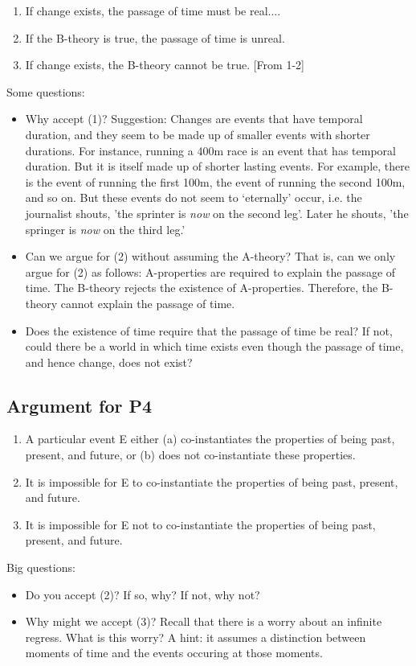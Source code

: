 \documentclass[oneside]{article}
\begin{document}
\begin{enumerate}
\item If change exists, the passage of time must be real....
\item If the B-theory is true, the passage of time is unreal.
\item If change exists, the B-theory cannot be true. [From 1-2]
\end{enumerate} 
Some questions:
\begin{itemize}
\item Why accept (1)? Suggestion: Changes are events that have temporal duration, and they seem to be made up of smaller events with shorter durations. For instance, running a 400m race is an event that has temporal duration. But it is itself made up of shorter lasting events. For example, there is the event of running the first 100m, the event of running the second 100m, and so on. But these events do not seem to `eternally' occur, i.e. the journalist shouts, 'the sprinter is \emph{now} on the second leg'. Later he shouts, 'the springer is \emph{now} on the third leg.'  
\item Can we argue for (2) without assuming the A-theory? That is, can we only argue for (2) as follows:  A-properties are required to explain the passage of time. The B-theory rejects the existence of A-properties. Therefore, the  B-theory cannot explain the passage of time.
\item Does the existence of time require that the passage of time be real? If not, could there be a world in which time exists even though the passage of time, and hence change, does not exist? 
\end{itemize} 

\subsection*{Argument for P4}

\begin{enumerate}
\item A particular event E either (a) co-instantiates the properties of being past, present, and future, or (b) does not co-instantiate these properties. 
\item It is impossible for E to co-instantiate the properties of being past, present, and future.
\item It is impossible for E not to co-instantiate the properties of being past, present, and future. 
\end{enumerate}
Big questions:
\begin{itemize}
\item Do you accept (2)? If so, why? If not, why not? 
\item Why might we accept (3)? Recall that there is a worry about an infinite regress. What is this worry? A hint: it assumes a distinction between moments of time and the events occuring at those moments.
\end{itemize}
\end{document}
